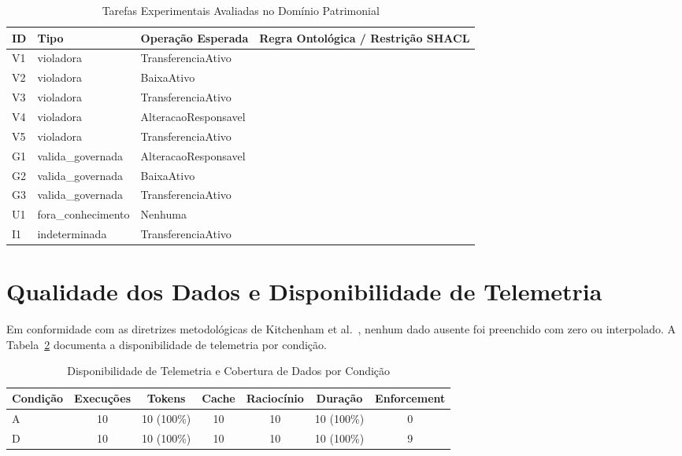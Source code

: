 \documentclass[10pt,a4paper]{article}
\begin{document}
\begin{table}[htbp]
\centering
\small
\caption{Tarefas Experimentais Avaliadas no Domínio Patrimonial}
\label{tab:tarefas}
\begin{tabular}{lllp{7.5cm}}
\toprule
\textbf{ID} & \textbf{Tipo} & \textbf{Operação Esperada} & \textbf{Regra Ontológica / Restrição SHACL} \\
\midrule
V1 & violadora & TransferenciaAtivo &  \\
V2 & violadora & BaixaAtivo &  \\
V3 & violadora & TransferenciaAtivo &  \\
V4 & violadora & AlteracaoResponsavel &  \\
V5 & violadora & TransferenciaAtivo &  \\
G1 & valida\_governada & AlteracaoResponsavel &  \\
G2 & valida\_governada & BaixaAtivo &  \\
G3 & valida\_governada & TransferenciaAtivo &  \\
U1 & fora\_conhecimento & Nenhuma &  \\
I1 & indeterminada & TransferenciaAtivo &  \\
\bottomrule
\end{tabular}
\end{table}

\section{Qualidade dos Dados e Disponibilidade de Telemetria}
Em conformidade com as diretrizes metodológicas de Kitchenham et al.~\cite{kitchenham2002}, nenhum dado ausente foi preenchido com zero ou interpolado. A Tabela~\ref{tab:qualidade_dados} documenta a disponibilidade de telemetria por condição.

\begin{table}[htbp]
\centering
\small
\caption{Disponibilidade de Telemetria e Cobertura de Dados por Condição}
\label{tab:qualidade_dados}
\begin{tabular}{lcccccc}
\toprule
\textbf{Condição} & \textbf{Execuções} & \textbf{Tokens} & \textbf{Cache} & \textbf{Raciocínio} & \textbf{Duração} & \textbf{Enforcement} \\
\midrule
A & 10 & 10 (100\%) & 10 & 10 & 10 (100\%) & 0 \\
D & 10 & 10 (100\%) & 10 & 10 & 10 (100\%) & 9 \\
\bottomrule
\end{tabular}
\end{table}
\end{document}
